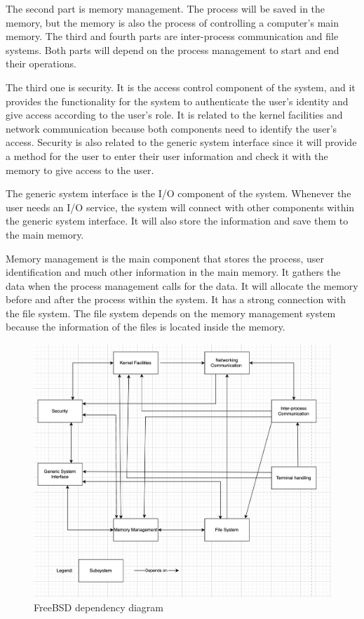 \documentclass[12pt, dvipsnames, a4paper]{article}
\begin{document}
The second part is memory management. The process will be saved in the memory, but the memory is also the process of controlling a
computer's main memory. The third and fourth parts are inter-process communication and file systems. Both parts will depend on the process management to start and end their
operations.

The third one is security. It is the access control component of the system, and it provides the functionality for the system to authenticate the user's identity and give access according to the user's role. It is related to the kernel facilities and network communication because both components need to identify the user's access. Security is also related to the generic system interface since it will provide a method for the user to enter their user information and check it with the memory to give access to the user.

The generic system interface is the I/O component of the system. Whenever the user needs an I/O service, the system will connect with other components within the generic system interface. It will also store the information and save them to the main memory.

Memory management is the main component that stores the process, user identification and much other information in the main memory. It gathers the data when the process management calls for the data. It will allocate the memory before and after the process within the system. It has a strong connection with the file system. The file system depends on the memory management system because the information of the files is located inside the memory.
\begin{figure}[!htb]
	\centering
	\includegraphics[width = 390pt]{assets/other_diagrams/dependency-structure.png}
	\caption{FreeBSD dependency diagram \cite{design}}
\end{figure}
\end{document}
